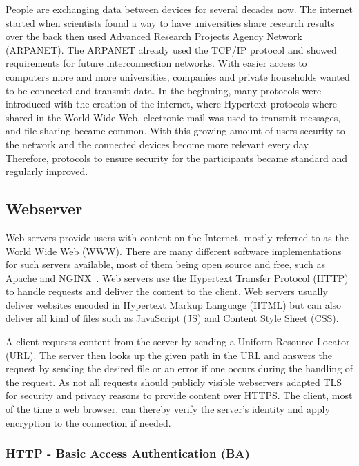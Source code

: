 People are exchanging data between devices for several decades now. The internet
started when scientists found a way to have universities share research results
over the back then used Advanced Research Projects Agency Network (ARPANET).
The ARPANET already used the TCP/IP protocol and showed requirements for future
interconnection networks. With easier access to computers more and more
universities, companies and private households wanted to be connected and
transmit data. In the beginning, many protocols were introduced with the
creation of the internet, where Hypertext protocols where shared in the World
Wide Web, electronic mail was used to transmit messages, and file sharing became
common. With this growing amount of users security to the network and the
connected devices become more relevant every day. Therefore, protocols to ensure
security for the participants became standard and regularly improved.

\subsection{Webserver}

Web servers provide users with content on the Internet, mostly referred to as
the World Wide Web (WWW). There are many different software implementations for
such servers available, most of them being open source and free, such as Apache
and NGINX~. Web servers use the Hypertext
Transfer Protocol (HTTP) to handle requests and deliver the content to the
client. Web servers usually deliver websites encoded in Hypertext Markup
Language (HTML) but can also deliver all kind of files such as JavaScript (JS)
and Content Style Sheet (CSS).

A client requests content from the server by sending a Uniform Resource Locator
(URL). The server then looks up the given path in the URL and answers the
request by sending the desired file or an error if one occurs during the
handling of the request. As not all requests should publicly visible webservers
adapted TLS for security and privacy reasons to provide content over HTTPS. The
client, most of the time a web browser, can thereby verify the server's identity
and apply encryption to the connection if needed.

\subsubsection{HTTP - Basic Access Authentication (BA)}

